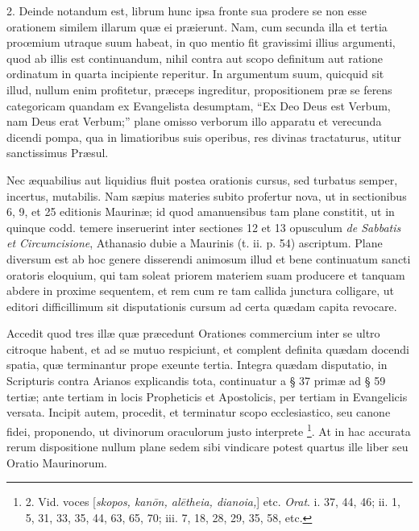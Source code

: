 2.
Deinde notandum est, librum hunc ipsa fronte sua prodere se non esse
orationem similem illarum quæ ei præierunt. Nam, cum secunda illa et
tertia proœmium utraque suum habeat, in quo mentio fit gravissimi
illius argumenti, quod ab illis est continuandum, nihil contra aut
scopo definitum aut ratione ordinatum in quarta incipiente reperitur.
In argumentum suum, quicquid sit illud, nullum enim profitetur, præceps
ingreditur, propositionem præ se ferens categoricam quandam ex
Evangelista desumptam, ``Ex Deo Deus est Verbum, nam Deus erat
Verbum;'' plane omisso verborum illo apparatu et verecunda dicendi
pompa, qua in limatioribus suis operibus, res divinas tractaturus,
utitur sanctissimus Præsul.

Nec
æquabilius aut liquidius fluit postea orationis cursus, sed turbatus
semper, incertus, mutabilis. Nam sæpius materies subito profertur
nova, ut in sectionibus 6, 9, et 25 editionis Maurinæ; id quod
amanuensibus tam plane constitit, ut in quinque codd. temere
inseruerint inter sectiones 12 et 13 opusculum \emph{de Sabbatis et
Circumcisione}, Athanasio dubie a Maurinis (t. ii. p. 54) ascriptum.
Plane diversum est ab hoc genere disserendi animosum illud et bene
continuatum sancti oratoris eloquium, qui tam soleat priorem materiem
suam producere et tanquam abdere in proxime sequentem, et rem cum re
tam callida junctura colligare, ut editori difficillimum sit
disputationis cursum ad certa quædam capita revocare.

Accedit
quod tres illæ quæ præcedunt Orationes commercium inter se ultro
citroque habent, et ad se mutuo respiciunt, et complent definita quædam
docendi spatia, quæ terminantur prope exeunte tertia. Integra quædam
disputatio, in Scripturis contra Arianos explicandis tota, continuatur
a § 37 primæ ad § 59 tertiæ; ante tertiam in locis Propheticis et
Apostolicis, per tertiam in Evangelicis versata. Incipit autem,
procedit, et terminatur scopo ecclesiastico, seu canone fidei,
proponendo, ut divinorum oraculorum justo interprete \footnote{2.
Vid. voces [\emph{skopos, kan\={o}n, al\={e}theia, dianoia,}]
etc. \emph{Orat}. i. 37, 44, 46; ii. 1, 5, 31, 33, 35, 44, 63, 65, 70;
iii. 7, 18, 28, 29, 35, 58, etc.}. At in hac accurata rerum dispositione nullum plane sedem
sibi vindicare potest quartus ille liber seu Oratio Maurinorum.

